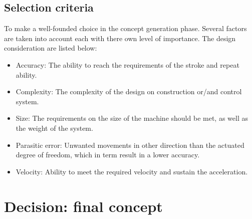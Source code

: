 \subsection{Selection criteria}
To make a well-founded choice in the concept generation phase. Several factors are taken into account each with there own level of importance. The design consideration are listed below: 

\begin{itemize}
    \item Accuracy: The ability to reach the requirements of the stroke and repeat ability.
    \item Complexity: The complexity of the design on construction or/and control system. 
    \item Size: The requirements on the size of the machine should be met, as well as the weight of the system.
    \item Parasitic error: Unwanted movements in other direction than the actuated degree of freedom, which in term result in a lower accuracy.
    \item Velocity: Ability to meet the required velocity and sustain the acceleration.
    
\end{itemize}





\section{Decision: final concept}